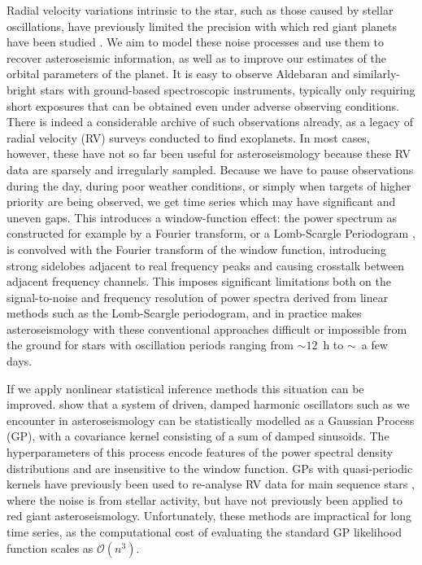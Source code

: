 \documentclass[modern]{aastex61}
\begin{document}
Radial velocity variations intrinsic to the star, such as those caused by stellar oscillations, have previously limited the precision with which red giant planets have been studied \citep{2005PASJ...57...97S}. We aim to model these noise processes and use them to recover asteroseismic information, as well as to improve our estimates of the orbital parameters of the planet. It is easy to observe Aldebaran and similarly-bright stars with ground-based spectroscopic instruments, typically only requiring short exposures that can be obtained even under adverse observing conditions. There is indeed a considerable archive of such observations already, as a legacy of radial velocity (RV) surveys conducted to find exoplanets. In most cases, however, these have not so far been useful for asteroseismology because these RV data are sparsely and irregularly sampled. Because we have to pause observations during the day, during poor weather conditions, or simply when targets of higher priority are being observed, we get time series which may have significant and uneven gaps. This introduces a window-function effect: the power spectrum as constructed for example by a Fourier transform, or a Lomb-Scargle Periodogram \citep{lomb,scargle}, is convolved with the Fourier transform of the window function, introducing strong sidelobes adjacent to real frequency peaks and causing crosstalk between adjacent frequency channels. This imposes significant limitations both on the signal-to-noise and frequency resolution of power spectra derived from linear methods such as the Lomb-Scargle periodogram, and in practice makes asteroseismology with these conventional approaches difficult or impossible from the ground for stars with oscillation periods ranging from $\sim 12$~h to $\sim$~a few days.

If we apply nonlinear statistical inference methods this situation can be
improved. \citet{brewer2009} show that a system of driven, damped harmonic
oscillators such as we encounter in asteroseismology can be statistically
modelled as a Gaussian Process (GP), with a covariance kernel consisting of a sum of
damped sinusoids. The hyperparameters of this process encode features of the
power spectral density distributions and are insensitive to the window function. GPs with quasi-periodic kernels have previously been used to re-analyse RV data for main sequence stars \citep{2014MNRAS.443.2517H,2015MNRAS.452.2269R}, where the noise is from stellar activity, but have not previously been applied to red giant asteroseismology.
Unfortunately, these methods are impractical for long time series, as the computational
cost of evaluating the standard GP likelihood function scales as
$\mathcal{O}(n^3)$.
\end{document}
